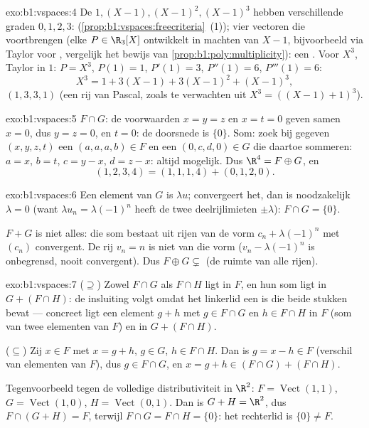 \begin{solution}{exo:b1:vspaces:4}
De  $1, (X-1), (X-1)^2, (X-1)^3$ hebben verschillende
graden $0, 1, 2, 3$: 
(\cref{prop:b1:vspaces:freecriteria}~(1)); vier  vectoren die
voortbrengen (elke $P \in \R_3[X]$ ontwikkelt in machten van $X -
1$, bijvoorbeeld via Taylor voor , vergelijk het bewijs
van \cref{prop:b1:poly:multiplicity}): een . Voor $X^3$, Taylor
in $1$: $P = X^3$, $P(1) = 1$, $P'(1) = 3$, $P''(1) = 6$, $P'''(1) =
6$:
\[
X^3 = 1 + 3(X - 1) + 3(X-1)^2 + (X-1)^3 ,
\]
 $(1, 3, 3, 1)$ (een rij van Pascal, zoals te verwachten
uit $X^3 = ((X-1)+1)^3$).
\end{solution}

\begin{solution}{exo:b1:vspaces:5}
$F \cap G$: de voorwaarden $x = y = z$ en $x = t = 0$ geven samen $x
= 0$, dus $y = z = 0$, en $t = 0$: de doorsnede is $\{0\}$. Som:
zoek bij gegeven $(x,y,z,t)$ een $(a,a,a,b) \in F$ en een $(0,c,d,0)
\in G$ die daartoe sommeren: $a = x$, $b = t$, $c = y - x$, $d = z -
x$: altijd mogelijk. Dus $\R^4 = F \oplus G$, en
\[
(1,2,3,4) = (1,1,1,4) + (0,1,2,0) .
\]
\end{solution}

\begin{solution}{exo:b1:vspaces:6}
Een element van $G$ is $\lambda u$; convergeert het, dan is
noodzakelijk $\lambda = 0$ (want $\lambda u_n = \lambda(-1)^n$ heeft
de twee deelrijlimieten $\pm \lambda$): $F \cap G = \{0\}$.

$F + G$ is niet alles: die som bestaat uit rijen van de vorm $c_n +
\lambda(-1)^n$ met $(c_n)$ convergent. De rij $v_n = n$ is niet van
die vorm ($v_n - \lambda(-1)^n$ is onbegrensd, nooit convergent).
Dus $F \oplus G \subsetneq$ (de ruimte van alle rijen).
\end{solution}

\begin{solution}{exo:b1:vspaces:7}
($\supseteq$) Zowel $F \cap G$ als $F \cap H$ ligt in $F$, en hun som
ligt in $G + (F \cap H)$: de insluiting volgt omdat het linkerlid
een  is die beide stukken bevat --- concreet ligt een
element $g + h$ met $g \in F\cap G$ en $h \in F \cap H$ in $F$ (som
van twee elementen van $F$) en in $G + (F \cap H)$.

($\subseteq$) Zij $x \in F$ met $x = g + h$, $g \in G$, $h \in F \cap
H$. Dan is $g = x - h \in F$ (verschil van elementen van $F$), dus
$g \in F \cap G$, en $x = g + h \in (F \cap G) + (F \cap H)$.

Tegenvoorbeeld tegen de volledige distributiviteit in $\R^2$: $F =
\operatorname{Vect}(1,1)$, $G = \operatorname{Vect}(1,0)$, $H =
\operatorname{Vect}(0,1)$. Dan is $G + H = \R^2$, dus $F \cap (G+H) =
F$, terwijl $F \cap G = F \cap H = \{0\}$: het rechterlid is $\{0\}
\neq F$.
\end{solution}

